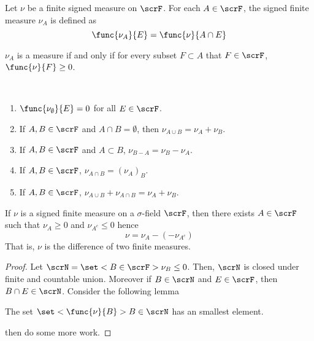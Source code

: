 \begin{definition}
    Let \(\nu\) be a finite signed measure on \(\scrF\). For each \(A \in \scrF\), the signed finite measure \(\nu_A\) is defined as 
    \begin{equation*}
        \func{\nu_A}{E} = \func{\nu}{A \cap E}
    \end{equation*}
\end{definition}

\begin{proposition}
    \(\nu_A\) is a measure if and only if for every subset \(F \subset A\) that \(F \in \scrF\), \(\func{\nu}{F} \geq 0\).
\end{proposition}

\begin{proposition}
    \ 
    \begin{enumerate}
        \item \(\func{\nu_{\emptyset}}{E} = 0\) for all \(E \in \scrF\).
        \item If \(A,B \in \scrF\) and \(A \cap B = \emptyset\), then \(\nu_{A \cup B} = \nu_A + \nu_B\).
        \item If \(A,B \in \scrF\) and \(A \subset B\), \(\nu_{B-A} = \nu_B - \nu_A\).
        \item If \(A,B \in \scrF\), \(\nu_{A \cap B} = (\nu_A)_B\).
        \item If \(A,B \in \scrF\), \(\nu_{A \cup B} + \nu_{A \cap B} = \nu_A + \nu_B\).
    \end{enumerate}
\end{proposition}

\begin{theorem}
    If \(\nu\) is a signed finite measure on a \(\sigma\)-field \(\scrF\), then there exists \(A \in \scrF\) such that \(\nu_A \geq 0\) and \(\nu_{A^c} \leq 0\) hence 
    \begin{equation*}
        \nu = \nu_A - (- \nu_{A^c})
    \end{equation*}
    That is, \(\nu\) is the difference of two finite measures.
\end{theorem}

\begin{proof}
    Let \(\scrN = \set<B \in \scrF>{\nu_B \leq 0}\). Then, \(\scrN\) is closed under finite and countable union. Moreover if \(B \in \scrN\) and \(E \in \scrF\), then \(B \cap E \in \scrN\). Consider the following lemma 
    \begin{lemma}
        The set \(\set<\func{\nu}{B}>{B \in \scrN}\) has an smallest element.
    \end{lemma}
    then do some more work.
\end{proof}



